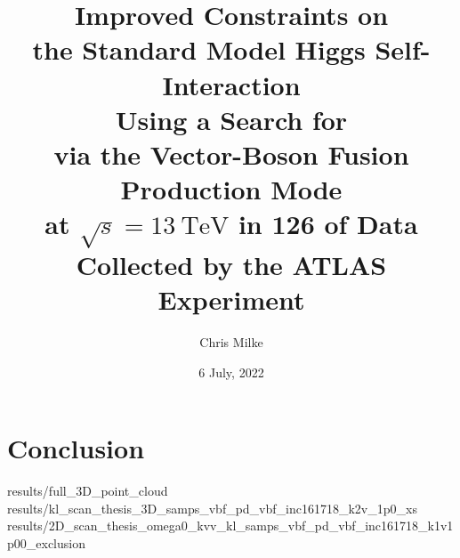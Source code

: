 \documentclass{beamer}
\begin{document}
\title{
    Improved Constraints on \\the Standard Model Higgs Self-Interaction \\
    Using a Search for \hhbbbb \\via the Vector-Boson Fusion Production Mode \\
    at $\sqrt{s}=13~\mathrm{TeV}$ in 126 \ifb of Data \\Collected by the ATLAS Experiment
}

\author{Chris Milke}
\date{6 July, 2022}

\frame{\titlepage}





\section{Conclusion}
{results/full_3D_point_cloud}
{results/kl_scan_thesis_3D_samps_vbf_pd_vbf_inc161718_k2v_1p0_xs}
{results/2D_scan_thesis_omega0_kvv_kl_samps_vbf_pd_vbf_inc161718_k1v1p00_exclusion}






\end{document}
